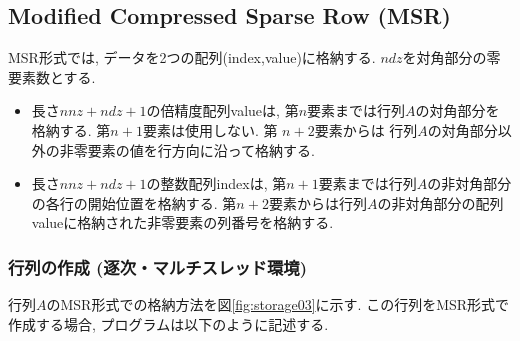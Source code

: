 \documentclass[a4paper]{jarticle}
\begin{document}
{{\newpage
\subsection{Modified Compressed Sparse Row (MSR)}
MSR形式では, データを2つの配列({\ttfamily index,value})に格納する. $ndz$を対角部分の零要素数とする. 
\begin{itemize}
\item 長さ$nnz + ndz + 1$の倍精度配列{\ttfamily value}は, 
第$n$要素までは行列$A$の対角部分を格納する. 第$n+1$要素は使用しない. 第
      $n+2$要素からは
行列$A$の対角部分以外の非零要素の値を行方向に沿って格納する. 
\item 長さ$nnz + ndz + 1$の整数配列{\ttfamily index}は, 
第$n+1$要素までは行列$A$の非対角部分の各行の開始位置を格納する. 
第$n+2$要素からは行列$A$の非対角部分の配列{\ttfamily value}に格納された非零要素の列番号を格納する. 
\end{itemize}

\subsubsection{行列の作成 (逐次・マルチスレッド環境)}
行列$A$のMSR形式での格納方法を図\ref{fig:storage03}に示す. 
この行列をMSR形式で作成する場合, プログラムは以下のように記述する. 

}}
\end{document}
